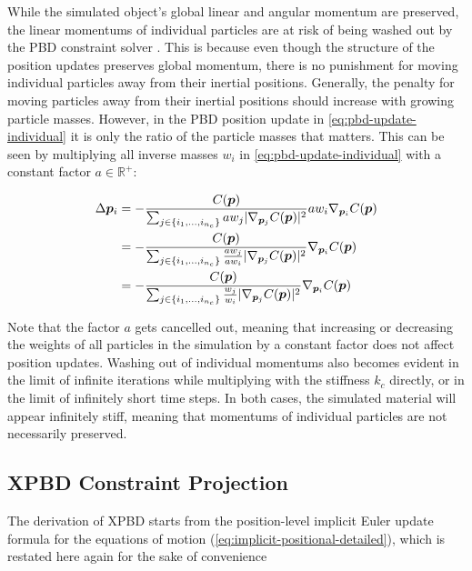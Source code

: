 While the simulated object's global linear and angular momentum are preserved, the linear momentums of individual particles are at risk of 
being washed out by the PBD constraint solver \cite{bouaziz2014}. This is because even though the structure of the position updates 
preserves global momentum, there is no punishment for moving individual particles away from their inertial positions. Generally, the 
penalty for moving particles away from their inertial positions should increase with growing particle masses. However, in the PBD
position update in \autoref{eq:pbd-update-individual} it is only the ratio of the particle masses that matters. This can be seen by multiplying
all inverse masses $w_i$ in \autoref{eq:pbd-update-individual} with a constant factor $a \in \mathbb{R}^+$:

\begin{equation}\label{eq:pbd-masses}
    \begin{split}
        \Delta \bm{p}_i 
        &= -\frac{C(\bm{p})}{\sum_{j \in \{ i_1, \ldots, i_{n_c} \}} aw_j \vert \nabla_{\bm{p}_j}C(\bm{p}) \vert^2 } aw_i \nabla_{\bm{p}_i} C(\bm{p}) \\
        &= -\frac{C(\bm{p})}{\sum_{j \in \{ i_1, \ldots, i_{n_c} \}} \frac{aw_j}{aw_i} \vert \nabla_{\bm{p}_j}C(\bm{p}) \vert^2 } \nabla_{\bm{p}_i} C(\bm{p}) \\
        &= -\frac{C(\bm{p})}{\sum_{j \in \{ i_1, \ldots, i_{n_c} \}} \frac{w_j}{w_i} \vert \nabla_{\bm{p}_j}C(\bm{p}) \vert^2 } \nabla_{\bm{p}_i} C(\bm{p})
    \end{split}
\end{equation}

\noindent Note that the factor $a$ gets cancelled out, meaning that increasing or decreasing the weights of all particles in the simulation by a constant
factor does not affect position updates. Washing out of individual momentums also becomes evident in the limit of infinite iterations while multiplying 
with the stiffness $k_c$ directly, or in the limit of infinitely short time steps. In both cases, the simulated material will appear infinitely stiff, 
meaning that momentums of individual particles are not necessarily preserved.

\subsection{XPBD Constraint Projection}\label{ss:xpbd-constraint-projection}
The derivation of XPBD \cite{macklin2016} starts from the position-level implicit Euler update formula for the equations of motion 
(\cref{eq:implicit-positional-detailed}), which is restated here again for the sake of convenience

